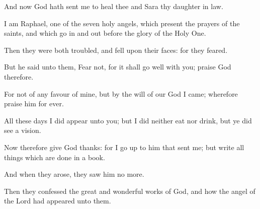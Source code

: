 {\par }{\PP {}And now God hath sent me to heal thee and Sara thy daughter in law.
\par }{\PP {}I am Raphael, one of the seven holy angels, which present the prayers of the saints, and which go in and out before the glory of the Holy One.
\par }{\PP {}Then they were both troubled, and fell upon their faces: for they feared.
\par }{\PP {}But he said unto them, Fear not, for it shall go well with you; praise God therefore.
\par }{\PP {}For not of any favour of mine, but by the will of our God I came; wherefore praise him for ever.
\par }{\PP {}All these days I did appear unto you; but I did neither eat nor drink, but ye did see a vision.
\par }{\PP {}Now therefore give God thanks: for I go up to him that sent me; but write all things which are done in a book.
\par }{\PP {}And when they arose, they saw him no more.
\par }{\PP {}Then they confessed the great and wonderful works of God, and how the angel of the Lord had appeared unto them.

}
